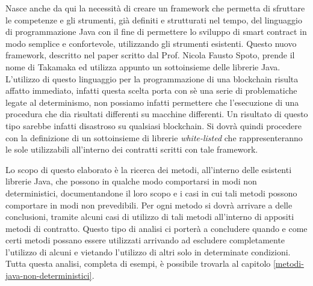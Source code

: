 Nasce anche da qui la necessità di creare un framework che permetta di sfruttare le competenze e gli strumenti, già definiti e strutturati nel tempo, del linguaggio di programmazione Java con il fine di permettere lo sviluppo di smart contract in modo semplice e confortevole, utilizzando gli strumenti esistenti. Questo nuovo framework, descritto nel paper \cite{paper-takamaka:spoto} scritto dal Prof. Nicola Fausto Spoto, prende il nome di Takamaka ed utilizza appunto un sottoinsieme delle librerie Java. L'utilizzo di questo linguaggio per la programmazione di una blockchain risulta affatto immediato, infatti questa scelta porta con sè una serie di problematiche legate al determinismo, non possiamo infatti permettere che l'esecuzione di una procedura che dia risultati differenti su macchine differenti. Un risultato di questo tipo sarebbe infatti disastroso su qualsiasi blockchain. Si dovrà quindi procedere con la definizione di un sottoinsieme di librerie \textit{white-listed} che rappresenteranno le sole utilizzabili all'interno dei contratti scritti con tale framework.

Lo scopo di questo elaborato è la ricerca dei metodi, all'interno delle esistenti librerie Java, che possono in qualche modo comportarsi in modi non deterministici, documentandone il loro scopo e i casi in cui tali metodi possono comportare in modi non prevedibili. Per ogni metodo si dovrà arrivare a delle conclusioni, tramite alcuni casi di utilizzo di tali metodi all'interno di appositi metodi di contratto. Questo tipo di analisi ci porterà a concludere quando e come certi metodi possano essere utilizzati arrivando ad escludere completamente l'utilizzo di alcuni e vietando l'utilizzo di altri solo in determinate condizioni. Tutta questa analisi, completa di esempi, è possibile trovarla al capitolo \ref{metodi-java-non-deterministici}.